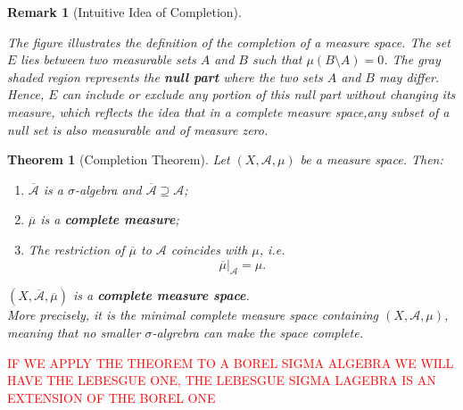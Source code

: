 \documentclass[10pt, oneside]{article}
\newenvironment{theorembox}[1][]{\begin{thmbox}\begin{thm}[#1]}{\end{thm}\end{thmbox}}
\newenvironment{remarkbox}[1][]{\begin{rembox}\begin{rem}[#1]}{\end{rem}\end{rembox}}
\numberwithin{equation}{section}
\newtheorem{thm}{Theorem}[section]
\newtheorem{rem}{Remark}
\begin{document}
\begin{remarkbox}[Intuitive Idea of Completion]
\begin{center}
\end{center}

\textit{
The figure illustrates the definition of the completion of a measure space.
The set $E$ lies between two measurable sets $A$ and $B$ such that 
$\mu(B \setminus A) = 0$. 
The gray shaded region represents the \textbf{null part} where the two sets 
$A$ and $B$ may differ. 
Hence, $E$ can include or exclude any portion of this null part without 
changing its measure, which reflects the idea that in a complete measure space,any subset of a null set is also measurable and of measure zero.}








\end{remarkbox}



\begin{theorembox}[Completion Theorem]
Let \((X, \mathcal{A}, \mu)\) be a measure space.  
Then:
\begin{enumerate}[label=(\roman*)]
    \item \(\overline{\mathcal{A}}\) is a $\sigma$-algebra and \(\overline{\mathcal{A}} \supseteq \mathcal{A}\);
    \item \(\overline{\mu}\) is a \textbf{complete measure};
    \item The restriction of \(\overline{\mu}\) to \(\mathcal{A}\) coincides with \(\mu\), i.e.
    \[
    \overline{\mu}\big|_{\mathcal{A}} = \mu.
    \]
\end{enumerate}
\((X,\overline{\mathcal{A}},\overline{\mu})\) is a  \textbf{complete measure space}.\\
More precisely, it is the minimal complete measure space containing \((X,\mathcal{A},\mu)\), meaning that no smaller $\sigma$-algrebra can make the space complete. 
\end{theorembox}

\textcolor{red}{IF WE APPLY THE THEOREM TO A BOREL SIGMA ALGEBRA WE WILL HAVE THE LEBESGUE ONE, THE LEBESGUE SIGMA LAGEBRA IS AN EXTENSION OF THE BOREL ONE }
\end{document}
